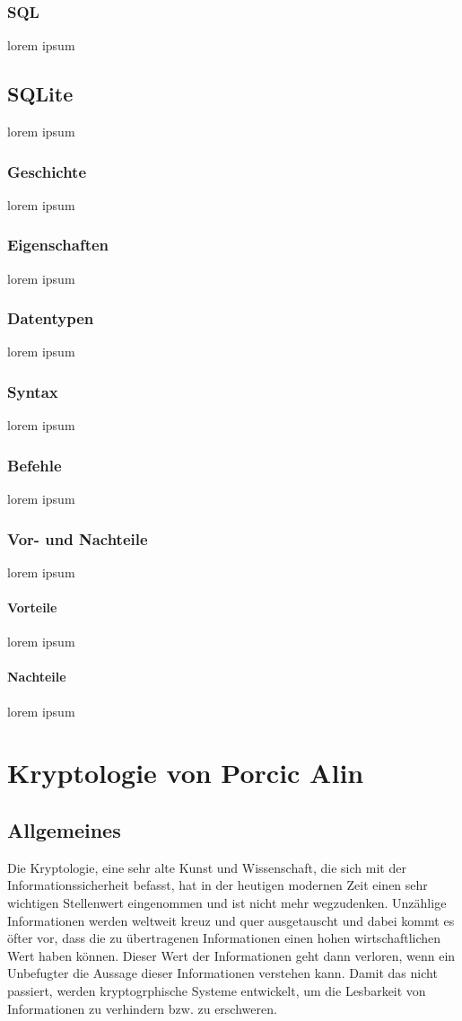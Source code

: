 \documentclass[11pt,a4paper]{report}
\begin{document}
\subsection{SQL}
lorem ipsum
\section{SQLite}
lorem ipsum
\subsection{Geschichte}
lorem ipsum
\subsection{Eigenschaften}
lorem ipsum
\subsection{Datentypen}
lorem ipsum
\subsection{Syntax}
lorem ipsum 
\subsection{Befehle}
lorem ipsum
\subsection{Vor- und Nachteile}
lorem ipsum
\subsubsection{Vorteile}
lorem ipsum
\subsubsection{Nachteile}
lorem ipsum

\chapter{Kryptologie von Porcic Alin}\label{chap:krypto}
\section{Allgemeines}

Die Kryptologie, eine sehr alte Kunst und Wissenschaft, die sich mit der Informationssicherheit befasst, hat in der heutigen modernen Zeit einen sehr wichtigen Stellenwert eingenommen und ist nicht mehr wegzudenken. Unzählige Informationen werden weltweit kreuz und quer ausgetauscht und dabei kommt es öfter vor, dass die zu übertragenen Informationen einen hohen wirtschaftlichen Wert haben können. Dieser Wert der Informationen geht dann verloren, wenn ein Unbefugter die Aussage dieser Informationen verstehen kann. Damit das nicht passiert, werden kryptogrphische Systeme entwickelt, um die Lesbarkeit von Informationen zu verhindern bzw. zu erschweren.\\
\end{document}
